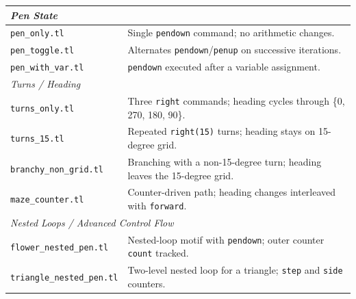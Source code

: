 {\begin{longtable}{p{} p{}}
\midrule
\multicolumn{2}{l}{\textit{Pen State}} \\
\midrule
\texttt{pen\_only.tl}           & Single \texttt{pendown} command; no arithmetic changes. \\
\texttt{pen\_toggle.tl}         & Alternates \texttt{pendown}/\texttt{penup} on successive iterations. \\
\texttt{pen\_with\_var.tl}      & \texttt{pendown} executed after a variable assignment. \\

\midrule
\multicolumn{2}{l}{\textit{Turns / Heading}} \\
\midrule
\texttt{turns\_only.tl}         & Three \texttt{right} commands; heading cycles through \{0, 270, 180, 90\}. \\
\texttt{turns\_15.tl}           & Repeated \texttt{right(15)} turns; heading stays on 15-degree grid. \\
\texttt{branchy\_non\_grid.tl}  & Branching with a non-15-degree turn; heading leaves the 15-degree grid. \\
\texttt{maze\_counter.tl}       & Counter-driven path; heading changes interleaved with \texttt{forward}. \\

\midrule
\multicolumn{2}{l}{\textit{Nested Loops / Advanced Control Flow}} \\
\midrule
\texttt{flower\_nested\_pen.tl}   & Nested-loop motif with \texttt{pendown}; outer counter \texttt{count} tracked. \\
\texttt{triangle\_nested\_pen.tl} & Two-level nested loop for a triangle; \texttt{step} and \texttt{side} counters. \\


\end{longtable}}
